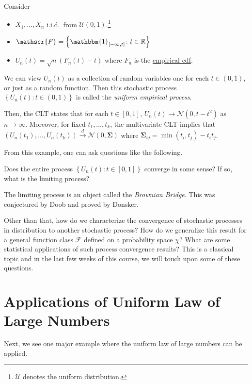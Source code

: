 \begin{eg}
	Consider
	\begin{itemize}
		\item \(X_1, \dots , X_n\) i.i.d.\ from \(\mathcal{U} (0, 1)\).\footnote{\(\mathcal{U}\) denotes the uniform distribution.}
		\item \(\mathscr{F} = \left\{ \mathbbm{1}_{[-\infty , t]} \colon t\in \mathbb{R}  \right\} \)
		\item \(U_n(t) = \sqrt{n} (F_n(t) - t) \) where \(F_n\) is the \hyperref[def:empirical-cdf]{empirical cdf}.
	\end{itemize}
	We can view \(U_n(t) \) as a collection of random variables one for each \(t\in (0, 1)\), or just as a random function. Then this stochastic process \(\left\{ U_n(t)\colon t\in (0, 1) \right\} \) is called the \emph{uniform empirical process}.

	Then, the CLT states that for each \(t\in [0, 1]\), \(U_n(t) \to \mathcal{N} (0, t - t^2)\) as \(n \to \infty \). Moreover, for fixed \(t_1, \dots , t_k\), the multivariate CLT implies that \((U_n(t_1), \dots , U_n(t_k)) \overset{d}{\to } \mathcal{N} (0, \mathbf{\Sigma} ) \) where \(\mathbf{\Sigma} _{ij} = \min (t_i, t_j) - t_i t_j\).
\end{eg}

From this example, one can ask questions like the following.

\begin{problem*}
	Does the entire process \(\left\{ U_n(t)\colon t\in [0, 1] \right\} \) converge in some sense? If so, what is the limiting process?
\end{problem*}
\begin{answer}
	The limiting process is an object called the \emph{Brownian Bridge}. This was conjectured by Doob and proved by Donsker.
\end{answer}

Other than that, how do we characterize the convergence of stochastic processes in distribution to another stochastic process? How do we generalize this result for a general function class \(\mathscr{F} \) defined on a probability space \(\chi \)? What are some statistical applications of such process convergence results? This is a classical topic and in the last few weeks of this course, we will touch upon some of these questions.

\section{Applications of Uniform Law of Large Numbers}
Next, we see one major example where the uniform law of large numbers can be applied.

